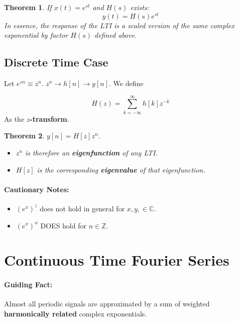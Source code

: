 \documentclass[a4paper,12pt]{report}
\newtheorem{theorem}{Theorem}
\begin{document}
\begin{theorem}
If $x(t) = e^{st}$ and $H(s)$ exists: 
\begin{equation}
y(t) = H(s)e^{st}
\end{equation}
In essence, the response of the LTI is a scaled version of the same complex exponential by factor $H(s)$ defined above.
\end{theorem}

\subsection{Discrete Time Case}

Let $e^{sn} \equiv z^n$. $z^n \to h[n] \to y[n]$. We define

\begin{equation}
H(z) = \sum_{k=-\infty}^{\infty} h[k] z^{-k}
\end{equation}
As the \textbf{$z$-transform}. 

\begin{theorem}
$y[n] = H[z]z^n$. 
\begin{itemize}
\item $z^n$ is therefore an \textbf{eigenfunction} of any LTI.
\item $H[z]$ is the corresponding \textbf{eigenvalue} of that eigenfunction.
\end{itemize}
\end{theorem}


\paragraph{Cautionary Notes: } 
\begin{itemize}
\item $(e^x)^z$ does not hold in general for $x, y, \in \mathbb{C}$.
\item $(e^x)^n$ DOES hold for $n\in \mathbb{Z}$.
\end{itemize}

\section{Continuous Time Fourier Series}

\paragraph{Guiding Fact: } Almost all periodic signals are approximated by a sum of weighted \textbf{harmonically related} complex exponentials.
\end{document}
